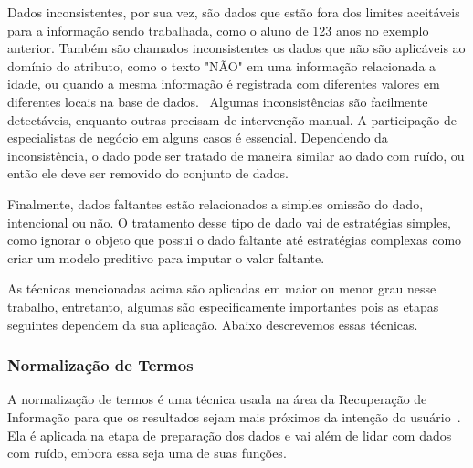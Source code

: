 \documentclass[12pt,a4paper]{article}
\begin{document}
Dados inconsistentes, por sua vez, são dados que estão fora dos limites aceitáveis para a informação sendo trabalhada, como o aluno de 123 anos no exemplo anterior. Também são chamados inconsistentes os dados que não são aplicáveis ao domínio do atributo, como o texto "NÃO" em uma informação relacionada a idade, ou quando a mesma informação é registrada com diferentes valores em diferentes locais na base de dados.~\cite{Nunes2016} Algumas inconsistências são facilmente detectáveis, enquanto outras precisam de intervenção manual. A participação de especialistas de negócio em alguns casos é essencial. Dependendo da inconsistência, o dado pode ser tratado de maneira similar ao dado com ruído, ou então ele deve ser removido do conjunto de dados.

Finalmente, dados faltantes estão relacionados a simples omissão do dado, intencional ou não. O tratamento desse tipo de dado vai de estratégias simples, como ignorar o objeto que possui o dado faltante até estratégias complexas como criar um modelo preditivo para imputar o valor faltante.

As técnicas mencionadas acima são aplicadas em maior ou menor grau nesse trabalho, entretanto, algumas são especificamente importantes pois as etapas seguintes dependem da sua aplicação. Abaixo descrevemos essas técnicas.

\subsubsection*{Normalização de Termos}
A normalização de termos é uma técnica usada na área da Recuperação de Informação para que os resultados sejam mais próximos da intenção do usuário~\cite{Manning2008-fw}. Ela é aplicada na etapa de preparação dos dados e vai além de lidar com dados com ruído, embora essa seja uma de suas funções.
\end{document}
